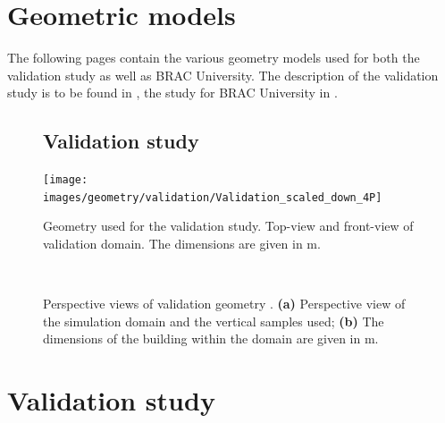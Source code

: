 
\chapter{Geometric models}
\label{chap:geometric_models}

The following pages contain the various geometry models used for both the validation study as well as BRAC University. The description of the validation study is to be found in , the study for BRAC University in .




\clearpage




\begin{figure}[!h]
	\section{Validation study}
	\centering
	\texttt{[image: images/geometry/validation/Validation\_scaled\_down\_4P]}
	\captionsetup{format=plain}	
	\caption[Geometry used for the validation study; top-view and front-view]{Geometry used for the validation study. Top-view and front-view of validation domain. The dimensions are given in \si{\metre}.}
	\label{fig:validationscaleddown4p}
\end{figure}



\begin{figure}[!h]
	\centering
	\\
	\captionsetup{format=plain}	
	\caption[Geometry used for the validation study; perspective views]{Perspective views of validation geometry  \citep{Jiang2003}. \textbf{(a)} Perspective view of the simulation domain and the vertical samples used; \textbf{(b)} The dimensions of the building within the domain are given in \si{\metre}.}
	\label{fig:validationscaleddownbuilding}
\end{figure}




\clearpage
\chapter{Validation study}
